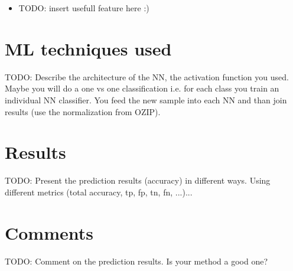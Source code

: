 \documentclass[a4paper]{article}
\begin{document}
\begin{itemize}
	\item TODO: insert usefull feature here :)
\end{itemize}

\section*{ML techniques used}
TODO: Describe the architecture of the NN, the activation function you used. Maybe you will do a one vs one classification i.e. for each class you train an individual NN classifier. You feed the new sample into each NN and than join results (use the normalization from OZIP).


\section*{Results}
TODO: Present the prediction results (accuracy) in different ways. Using different metrics (total accuracy, tp, fp, tn, fn, ...)...


\section*{Comments}
TODO: Comment on the prediction results. Is your method a good one?



\end{document}
